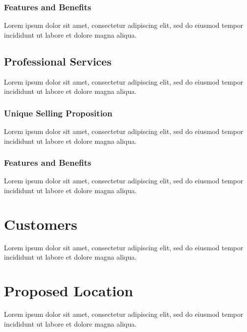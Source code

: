 \subsubsection*{Features and Benefits}

Lorem ipsum dolor sit amet, consectetur adipiscing elit, sed do eiusmod tempor incididunt ut labore et dolore magna aliqua.


\subsection{Professional Services}

Lorem ipsum dolor sit amet, consectetur adipiscing elit, sed do eiusmod tempor incididunt ut labore et dolore magna aliqua.

\subsubsection*{Unique Selling Proposition}

Lorem ipsum dolor sit amet, consectetur adipiscing elit, sed do eiusmod tempor incididunt ut labore et dolore magna aliqua.

\subsubsection*{Features and Benefits}

Lorem ipsum dolor sit amet, consectetur adipiscing elit, sed do eiusmod tempor incididunt ut labore et dolore magna aliqua.


\section{Customers}

Lorem ipsum dolor sit amet, consectetur adipiscing elit, sed do eiusmod tempor incididunt ut labore et dolore magna aliqua.


\section{Proposed Location}

Lorem ipsum dolor sit amet, consectetur adipiscing elit, sed do eiusmod tempor incididunt ut labore et dolore magna aliqua.

